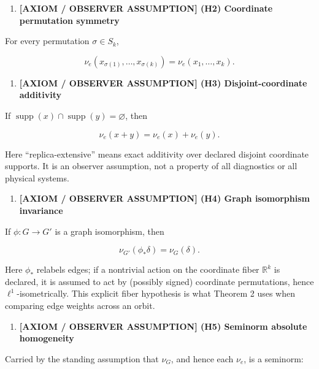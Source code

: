 \documentclass[
  11pt,
]{article}
\providecommand{\tightlist}{%
  \setlength{\itemsep}{0pt}\setlength{\parskip}{0pt}}
\providecommand{\tightlist}{%
  \setlength{\itemsep}{0pt}\setlength{\parskip}{0pt}}
\begin{document}
\begin{enumerate}
\def\labelenumi{\arabic{enumi}.}
\setcounter{enumi}{1}
\tightlist
\item
  \textbf{{[}AXIOM / OBSERVER ASSUMPTION{]} (H2) Coordinate permutation
  symmetry}
\end{enumerate}

For every permutation \(\sigma\in S_k\),

\[
\nu_e(x_{\sigma(1)},\ldots,x_{\sigma(k)}) = \nu_e(x_1,\ldots,x_k).
\]

\begin{enumerate}
\def\labelenumi{\arabic{enumi}.}
\setcounter{enumi}{2}
\tightlist
\item
  \textbf{{[}AXIOM / OBSERVER ASSUMPTION{]} (H3) Disjoint-coordinate
  additivity}
\end{enumerate}

If \(\operatorname{supp}(x)\cap\operatorname{supp}(y)=\varnothing\),
then

\[
\nu_e(x+y)=\nu_e(x)+\nu_e(y).
\]

Here ``replica-extensive'' means exact additivity over declared disjoint
coordinate supports. It is an observer assumption, not a property of all
diagnostics or all physical systems.

\begin{enumerate}
\def\labelenumi{\arabic{enumi}.}
\setcounter{enumi}{3}
\tightlist
\item
  \textbf{{[}AXIOM / OBSERVER ASSUMPTION{]} (H4) Graph isomorphism
  invariance}
\end{enumerate}

If \(\phi:G\to G'\) is a graph isomorphism, then

\[
\nu_{G'}(\phi_*\delta)=\nu_G(\delta).
\]

Here \(\phi_*\) relabels edges; if a nontrivial action on the coordinate
fiber \(\mathbb R^k\) is declared, it is assumed to act by (possibly
signed) coordinate permutations, hence \(\ell^1\)-isometrically. This
explicit fiber hypothesis is what Theorem 2 uses when comparing edge
weights across an orbit.

\begin{enumerate}
\def\labelenumi{\arabic{enumi}.}
\setcounter{enumi}{4}
\tightlist
\item
  \textbf{{[}AXIOM / OBSERVER ASSUMPTION{]} (H5) Seminorm absolute
  homogeneity}
\end{enumerate}

Carried by the standing assumption that \(\nu_G\), and hence each
\(\nu_e\), is a seminorm:
\end{document}
